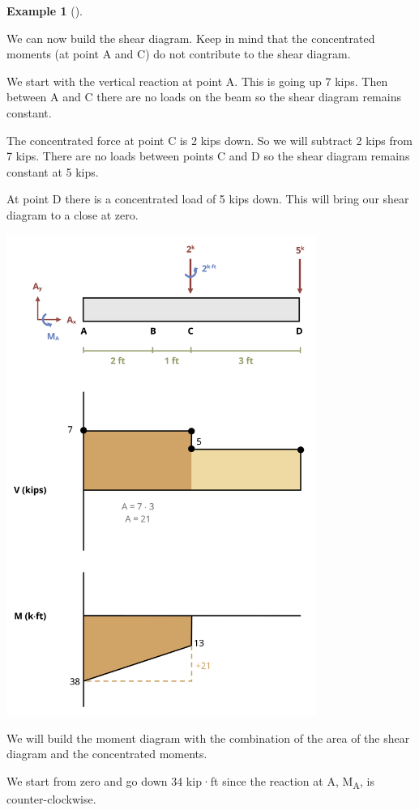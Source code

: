 \documentclass[
  letterpaper,
  DIV=11,
  numbers=noendperiod]{scrreprt}
\theoremstyle{definition}
\newtheorem{example}{Example}[chapter]
\theoremstyle{remark}
\begin{document}
\begin{tcolorbox}
\begin{example}[]
\begin{tcolorbox}
We can now build the shear diagram. Keep in mind that the concentrated
moments (at point A and C) do not contribute to the shear diagram.

We start with the vertical reaction at point A. This is going up 7 kips.
Then between A and C there are no loads on the beam so the shear diagram
remains constant.

The concentrated force at point C is 2 kips down. So we will subtract 2
kips from 7 kips. There are no loads between points C and D so the shear
diagram remains constant at 5 kips.

At point D there is a concentrated load of 5 kips down. This will bring
our shear diagram to a close at zero.

\begin{center}
\includegraphics[width=3.97917in,height=\textheight]{images/CH7 PNGs/example 7.4 part 4.png}
\end{center}

We will build the moment diagram with the combination of the area of the
shear diagram and the concentrated moments.

We start from zero and go down 34 kip·ft since the reaction at A,
M\textsubscript{A}, is counter-clockwise.


\end{tcolorbox}
\end{example}
\end{tcolorbox}
\end{document}
